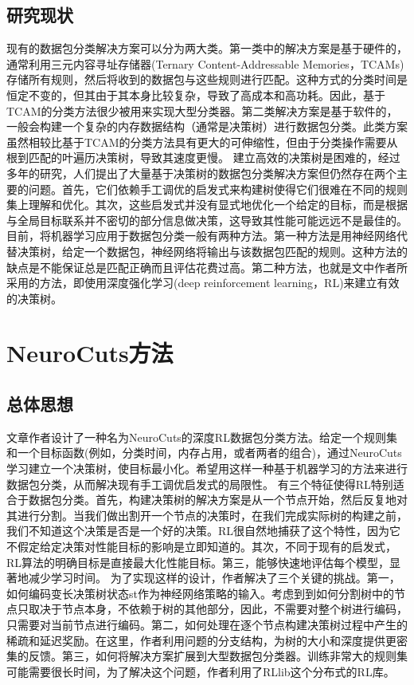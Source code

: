 \documentclass[UTF8,a4paper]{ctexart}
\begin{document}
\subsection{研究现状}
现有的数据包分类解决方案可以分为两大类。第一类中的解决方案是基于硬件的，通常利用三元内容寻址存储器(Ternary Content-Addressable Memories，TCAMs)存储所有规则，然后将收到的数据包与这些规则进行匹配。这种方式的分类时间是恒定不变的，但其由于其本身比较复杂，导致了高成本和高功耗。因此，基于TCAM的分类方法很少被用来实现大型分类器。第二类解决方案是基于软件的，一般会构建一个复杂的内存数据结构（通常是决策树）进行数据包分类。此类方案虽然相较比基于TCAM的分类方法具有更大的可伸缩性，但由于分类操作需要从根到匹配的叶遍历决策树，导致其速度更慢。
建立高效的决策树是困难的，经过多年的研究，人们提出了大量基于决策树的数据包分类解决方案但仍然存在两个主要的问题。首先，它们依赖手工调优的启发式来构建树使得它们很难在不同的规则集上理解和优化。其次，这些启发式并没有显式地优化一个给定的目标，而是根据与全局目标联系并不密切的部分信息做决策，这导致其性能可能远远不是最佳的。
目前，将机器学习应用于数据包分类一般有两种方法。第一种方法是用神经网络代替决策树，给定一个数据包，神经网络将输出与该数据包匹配的规则。这种方法的缺点是不能保证总是匹配正确而且评估花费过高。第二种方法，也就是文中作者所采用的方法，即使用深度强化学习(deep reinforcement learning，RL)来建立有效的决策树。

\section{NeuroCuts方法}
\subsection{总体思想}
文章作者设计了一种名为NeuroCuts的深度RL数据包分类方法。给定一个规则集和一个目标函数(例如，分类时间，内存占用，或者两者的组合)，通过NeuroCuts学习建立一个决策树，使目标最小化。希望用这样一种基于机器学习的方法来进行数据包分类，从而解决现有手工调优启发式的局限性。
有三个特征使得RL特别适合于数据包分类。首先，构建决策树的解决方案是从一个节点开始，然后反复地对其进行分割。当我们做出割开一个节点的决策时，在我们完成实际树的构建之前，我们不知道这个决策是否是一个好的决策。RL很自然地捕获了这个特性，因为它不假定给定决策对性能目标的影响是立即知道的。其次，不同于现有的启发式，RL算法的明确目标是直接最大化性能目标。第三，能够快速地评估每个模型，显著地减少学习时间。
为了实现这样的设计，作者解决了三个关键的挑战。第一，如何编码变长决策树状态st作为神经网络策略的输入。考虑到到如何分割树中的节点只取决于节点本身，不依赖于树的其他部分，因此，不需要对整个树进行编码，只需要对当前节点进行编码。第二，如何处理在逐个节点构建决策树过程中产生的稀疏和延迟奖励。在这里，作者利用问题的分支结构，为树的大小和深度提供更密集的反馈。第三，如何将解决方案扩展到大型数据包分类器。训练非常大的规则集可能需要很长时间，为了解决这个问题，作者利用了RLlib这个分布式的RL库。
\end{document}

